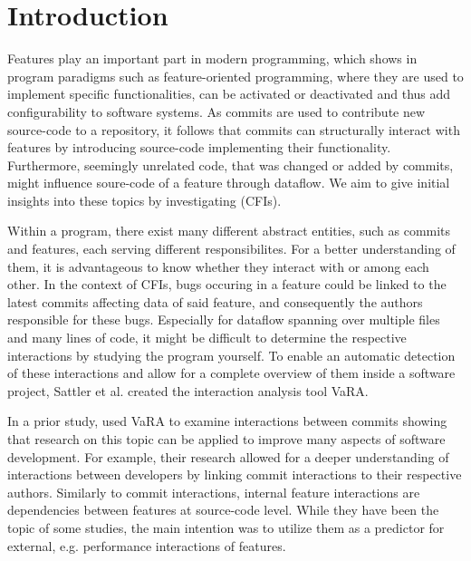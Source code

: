 \chapter{Introduction}\label{ch:introduction}

Features play an important part in modern programming, which shows in program paradigms such as feature-oriented programming,
where they are used to implement specific functionalities, can be activated or deactivated and thus add configurability to software systems.
As commits are used to contribute new source-code to a repository, it follows that commits can structurally interact with features by introducing source-code implementing their functionality. 
Furthermore, seemingly unrelated code, that was changed or added by commits, might influence soure-code of a feature through dataflow.
We aim to give initial insights into these topics by investigating  (CFIs).

Within a program, there exist many different abstract entities, such as commits and features, each serving different responsibilites.
For a better understanding of them, it is advantageous to know whether they interact with or among each other.
In the context of CFIs, bugs occuring in a feature could be linked to the latest commits affecting data of said feature, and consequently the authors responsible for these bugs.
Especially for dataflow spanning over multiple files and many lines of code, it might be difficult to determine the respective interactions by studying the program yourself.
To enable an automatic detection of these interactions and allow for a complete overview of them inside a software project, Sattler et al.\cite{sattler2023thesis} created the interaction analysis tool VaRA\cite{VaRA2023}.

In a prior study, \citet{sattler2023seal} used VaRA to examine interactions between commits showing that research on this topic can be applied to improve many aspects of software development.
For example, their research allowed for a deeper understanding of interactions between developers by linking commit interactions to their respective authors\cite{sattler2023seal}. 
Similarly to commit interactions, internal feature interactions are dependencies between features at source-code level. 
While they have been the topic of some studies\cite{kolesnikov2017relation}, the main intention was to utilize them as a predictor for external, e.g. performance interactions\cite{siegmund2012predicting} of features.

